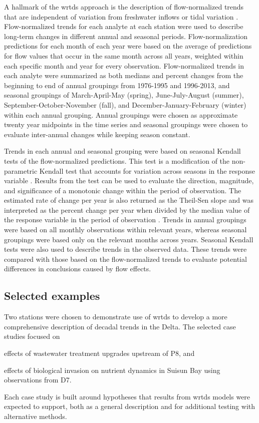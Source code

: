 \documentclass[letterpaper,12pt,oneside]{article}\usepackage[]{graphicx}\usepackage[]{color}
\begin{document}
A hallmark of the \ac{wrtds} approach is the description of flow-normalized trends that are independent of variation from freshwater inflows \citep{Hirsch10} or tidal variation \citep{Beck15}. Flow-normalized trends for each analyte at each station were used to describe long-term changes in different annual and seasonal periods. Flow-normalization predictions for each month of each year were based on the average of predictions for flow values that occur in the same month across all years, weighted within each specific month and year for every observation. Flow-normalized trends in each analyte were summarized as both medians and percent changes from the beginning to end of annual groupings from 1976-1995 and 1996-2013, and seasonal groupings of March-April-May (spring), June-July-August (summer), September-October-November (fall), and December-January-February (winter) within each annual grouping. Annual groupings were chosen as approximate twenty year midpoints in the time series and seasonal groupings were chosen to evaluate inter-annual changes while keeping season constant. 

Trends in each annual and seasonal grouping were based on seasonal Kendall tests of the flow-normalized predictions. This test is a modification of the non-parametric Kendall test that accounts for variation across seasons in the response variable \citep{Hirsch82,Millard13}.  Results from the test can be used to evaluate the direction, magnitude, and significance of a monotonic change within the period of observation.  The estimated rate of change per year is also returned as the Theil-Sen slope and was interpreted as the percent change per year when divided by the median value of the response variable in the period of observation \citep{Jassby08}.  Trends in annual groupings were based on all monthly observations within relevant years, whereas seasonal groupings were based only on the relevant months across years.  Seasonal Kendall tests were also used to describe trends in the observed data.  These trends were compared with those based on the flow-normalized trends to evaluate potential differences in conclusions caused by flow effects.

\subsection{Selected examples}

Two stations were chosen to demonstrate use of \ac{wrtds} to develop a more comprehensive description of decadal trends in the Delta.  The selected case studies focused on \begin{inparaenum}[1\upshape)]		
\item effects of wastewater treatment upgrades upstream of P8, and		
\item effects of biological invasion on nutrient dynamics in Suisun Bay using observations from D7.		
\end{inparaenum}		
Each case study is built around hypotheses that results from \ac{wrtds} models were expected to support, both as a general description and for additional testing with alternative methods. 
\end{document}
